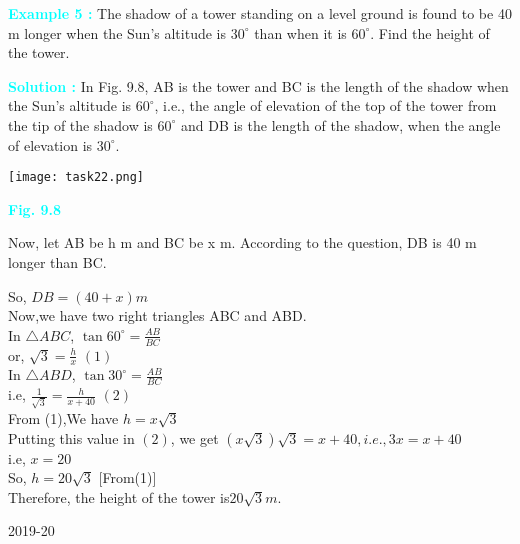 \documentclass[a4paper,12pt]{article}
\begin{document}
 \noindent\begin{minipage}[t]{0.5\textwidth}
 \textbf{\textcolor{cyan}{Example 5 :}} The shadow of a tower standing on a level ground is found to be 40 m longer when the Sun’s altitude is $30^\circ$ than when it is $60^\circ$. Find the height of the tower.

\vspace{1em}

\textbf{\textcolor{cyan}{Solution :}} In Fig. 9.8, AB is the tower and BC is the length of the shadow when the Sun’s altitude is $60^\circ$, i.e., the angle of elevation of the top of the tower from the tip of the shadow is $60^\circ$ and DB is the length of the shadow, when the angle of elevation is $30^\circ$.
\end{minipage}
\hfill
\begin{minipage}[t]{0.38\textwidth}
\vspace{-1em}
\texttt{[image: task22.png]}

\begin{center}
\vspace{-1em}
\textcolor{cyan}{\textbf{Fig. 9.8}}
\end{center}
\end{minipage}
\noindent 
\vspace{2em}
Now, let AB be h m and BC be x m. According to the question, DB is 40 m longer
than BC.\\
\begin{spacing}{2.1}
\noindent
So, \hspace{10em} $DB=(40+x)m $\\
Now,we have two right triangles ABC and ABD.\\
In $\triangle ABC$, \hspace{8em}
$\tan 60 ^\circ =\frac{AB}{BC}$\\
or,\hspace{12em}
$\sqrt{3}=\frac{h}{x}$ \hspace{15em} $(1)$\\
In $\triangle ABD$, \hspace{8em}
$\tan 30^ \circ =\frac{AB}{BC}$ \\
i.e, \hspace{11em}
$\frac{1}{\sqrt{3}}=\frac{h}{x+40}$  \hspace{14.5em} $(2)$\\
From (1),We have \hspace{5em} $h=x\sqrt{3} $ \\
Putting this value in $(2)$, we get $(x\sqrt{3})\sqrt{3}=x+40,i.e.,3x=x+40 $\\
i.e, \hspace{12em} $x=20$ \\
So, \hspace{12em} $h=20\sqrt{3}$  \hspace{13em} [From(1)]\\
Therefore, the height of the tower is$ 20\sqrt{3} m$.
\end{spacing}
\begin{center}
\vspace{1em}
2019-20
\end{center}
\end{document}
